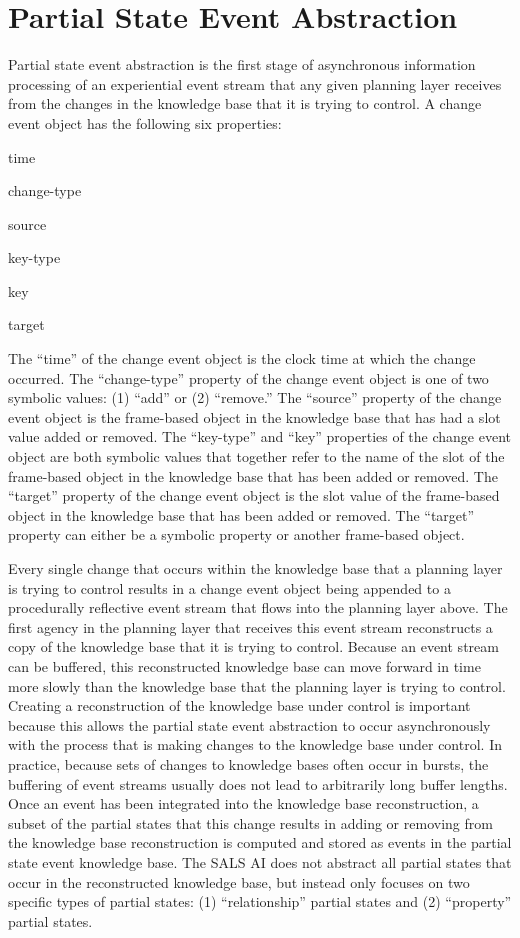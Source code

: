 \section{Partial State Event Abstraction}

Partial state event abstraction is the first stage of asynchronous
information processing of an experiential event stream that any given
planning layer receives from the changes in the knowledge base that it
is trying to control.  A change event object has the following six
properties:
\begin{packed_enumerate}
\item{time}
\item{change-type}
\item{source}
\item{key-type}
\item{key}
\item{target}
\end{packed_enumerate}
The ``time'' of the change event object is the clock time at which the
change occurred.  The ``change-type'' property of the change event
object is one of two symbolic values: (1) ``add'' or (2) ``remove.''
The ``source'' property of the change event object is the frame-based
object in the knowledge base that has had a slot value added or
removed.  The ``key-type'' and ``key'' properties of the change event
object are both symbolic values that together refer to the name of the
slot of the frame-based object in the knowledge base that has been
added or removed.  The ``target'' property of the change event object
is the slot value of the frame-based object in the knowledge base that
has been added or removed.  The ``target'' property can either be a
symbolic property or another frame-based object.

Every single change that occurs within the knowledge base that a
planning layer is trying to control results in a change event object
being appended to a procedurally reflective event stream that flows
into the planning layer above.  The first agency in the planning layer
that receives this event stream reconstructs a copy of the knowledge
base that it is trying to control.  Because an event stream can be
buffered, this reconstructed knowledge base can move forward in time
more slowly than the knowledge base that the planning layer is trying
to control.  Creating a reconstruction of the knowledge base under
control is important because this allows the partial state event
abstraction to occur asynchronously with the process that is making
changes to the knowledge base under control.  In practice, because
sets of changes to knowledge bases often occur in bursts, the
buffering of event streams usually does not lead to arbitrarily long
buffer lengths.  Once an event has been integrated into the knowledge
base reconstruction, a subset of the partial states that this change
results in adding or removing from the knowledge base reconstruction
is computed and stored as events in the partial state event knowledge
base.  The SALS AI does not abstract all partial states that occur in
the reconstructed knowledge base, but instead only focuses on two
specific types of partial states: (1) ``relationship'' partial states
and (2) ``property'' partial states.

